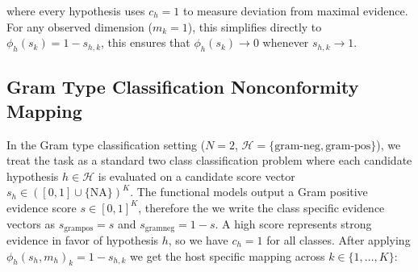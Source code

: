 where every hypothesis uses $c_h = 1$ to measure deviation from maximal evidence. For any observed dimension ($m_k=1$), 
this simplifies directly to $\phi_h(s_k) = 1 - s_{h,k}$, this ensures that $\phi_h(s_k) \to 0$ whenever $s_{h,k} \to 1$.





\subsection{Gram Type Classification Nonconformity Mapping}
\label{sec3.3.1: gram nc mapping}


In the Gram type classification setting ($N = 2$, $\mathcal{H} = \{\text{gram-neg}, \text{gram-pos}\}$), we treat the task as 
a standard two class classification problem where each candidate hypothesis $h \in \mathcal{H}$ is evaluated on a candidate 
score vector $s_h \in ([0,1] \cup \{\text{NA}\})^K$.  The functional models output a Gram positive evidence score $s \in 
[0,1]^K$, therefore the we write the class specific evidence vectors as $s_{\text{grampos}} = s$ and $s_{\text{gramneg}} = 
1 - s$. A high score represents strong evidence in favor of hypothesis $h$, so we have $c_h = 1$ for all classes. 
After applying $\phi_h(s_h, m_h)_k = 1 - s_{h,k}$ we get the host specific mapping across $k \in \{1, \dots, K\}$:

